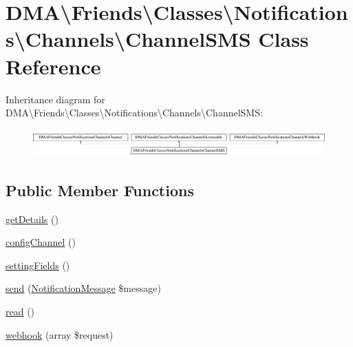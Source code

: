 \hypertarget{classDMA_1_1Friends_1_1Classes_1_1Notifications_1_1Channels_1_1ChannelSMS}{}\section{D\+M\+A\textbackslash{}Friends\textbackslash{}Classes\textbackslash{}Notifications\textbackslash{}Channels\textbackslash{}Channel\+S\+M\+S Class Reference}
\label{classDMA_1_1Friends_1_1Classes_1_1Notifications_1_1Channels_1_1ChannelSMS}
Inheritance diagram for D\+M\+A\textbackslash{}Friends\textbackslash{}Classes\textbackslash{}Notifications\textbackslash{}Channels\textbackslash{}Channel\+S\+M\+S\+:\begin{figure}[H]
\begin{center}
\leavevmode
\includegraphics[height=1.060606cm]{d2/d14/classDMA_1_1Friends_1_1Classes_1_1Notifications_1_1Channels_1_1ChannelSMS}
\end{center}
\end{figure}
\subsection*{Public Member Functions}
\begin{DoxyCompactItemize}
\item 
\hyperlink{classDMA_1_1Friends_1_1Classes_1_1Notifications_1_1Channels_1_1ChannelSMS_a262b4247250915521d2d9962c9624fc7}{get\+Details} ()
\item 
\hyperlink{classDMA_1_1Friends_1_1Classes_1_1Notifications_1_1Channels_1_1ChannelSMS_a3b57af73b9e017991e9872232717b686}{config\+Channel} ()
\item 
\hyperlink{classDMA_1_1Friends_1_1Classes_1_1Notifications_1_1Channels_1_1ChannelSMS_aee4d07da05caa5a14b8c126d6ccf2083}{setting\+Fields} ()
\item 
\hyperlink{classDMA_1_1Friends_1_1Classes_1_1Notifications_1_1Channels_1_1ChannelSMS_a74d477bcee51e0a8d4c27e482e775eb8}{send} (\hyperlink{classDMA_1_1Friends_1_1Classes_1_1Notifications_1_1NotificationMessage}{Notification\+Message} \$message)
\item 
\hyperlink{classDMA_1_1Friends_1_1Classes_1_1Notifications_1_1Channels_1_1ChannelSMS_ad07cd397e4a5d268f56cf59c850f1583}{read} ()
\item 
\hyperlink{classDMA_1_1Friends_1_1Classes_1_1Notifications_1_1Channels_1_1ChannelSMS_a64e0d1bb196c93b02f3f208b50574c76}{webhook} (array \$request)
\end{DoxyCompactItemize}

